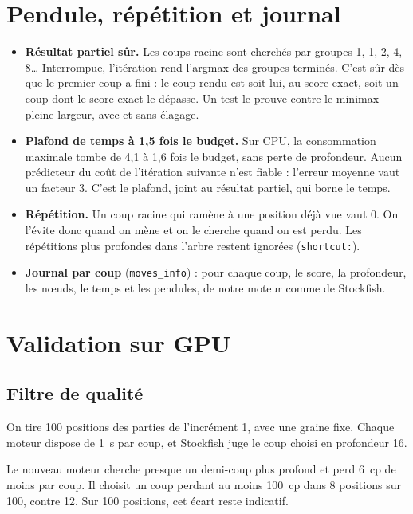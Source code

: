 \documentclass[11pt,a4paper]{article}
\newcommand{\code}[1]{\texttt{#1}}
\begin{document}
\section{Pendule, répétition et journal}
\begin{itemize}
\item \textbf{Résultat partiel sûr.} Les coups racine sont cherchés par groupes 1, 1, 2, 4, 8\ldots
Interrompue, l'itération rend l'argmax des groupes terminés. C'est sûr dès que le premier coup a
fini : le coup rendu est soit lui, au score exact, soit un coup dont le score exact le dépasse. Un
test le prouve contre le minimax pleine largeur, avec et sans élagage.
\item \textbf{Plafond de temps à 1{,}5 fois le budget.} Sur CPU, la consommation maximale tombe de
4{,}1 à 1{,}6 fois le budget, sans perte de profondeur. Aucun prédicteur du coût de l'itération
suivante n'est fiable : l'erreur moyenne vaut un facteur 3. C'est le plafond, joint au résultat
partiel, qui borne le temps.
\item \textbf{Répétition.} Un coup racine qui ramène à une position déjà vue vaut 0. On l'évite
donc quand on mène et on le cherche quand on est perdu. Les répétitions plus profondes dans
l'arbre restent ignorées (\code{shortcut:}).
\item \textbf{Journal par coup} (\code{moves\_info}) : pour chaque coup, le score, la profondeur, les
nœuds, le temps et les pendules, de notre moteur comme de Stockfish.
\end{itemize}

\section{Validation sur GPU}
\subsection{Filtre de qualité}
On tire 100 positions des parties de l'incrément 1, avec une graine fixe. Chaque moteur dispose de
1~s par coup, et Stockfish juge le coup choisi en profondeur 16.
\begin{table}[H]
\centering\small
\caption{Perte du coup choisi par chaque moteur sur les mêmes 100 positions.}
\end{table}
Le nouveau moteur cherche presque un demi-coup plus profond et perd 6~cp de moins par coup. Il
choisit un coup perdant au moins 100~cp dans 8 positions sur 100, contre 12. Sur 100 positions,
cet écart reste indicatif.
\end{document}
